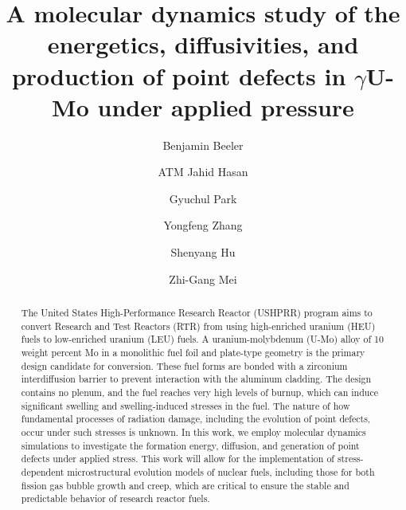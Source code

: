 \documentclass[review]{elsarticle}
\begin{document}
\begin{frontmatter} 

\title{A molecular dynamics study of the energetics, diffusivities, and production of point defects in $\gamma$U-Mo under applied pressure}

\author[ncsu,inl]{Benjamin Beeler }
\author[ncsu]{ATM Jahid Hasan}
\author[anl]{Gyuchul Park}
\author[wis,inl]{Yongfeng Zhang}
\author[pnnl]{Shenyang Hu}
\author[anl]{Zhi-Gang Mei}

\address[ncsu]{Department of Nuclear Engineering, North Carolina State University, Raleigh, NC 27695, United States}
\address[inl]{Idaho National Laboratory, Idaho Falls, ID 83415, United States}
\address[anl]{Argonne National Laboratory, Lemont, IL 60439, United States}
\address[wis]{Department of Nuclear Engineering and Engineering Physics, University of Wisconsin-Madison, Madison, WI 53706, United States}
\address[pnnl]{Pacific Northwest National Laboratory, Richland, WA 99354, United States}



\begin{abstract}
The United States High-Performance Research Reactor (USHPRR) program aims to convert Research and Test Reactors (RTR) from using high-enriched uranium (HEU) fuels to low-enriched uranium (LEU) fuels. A uranium-molybdenum (U-Mo) alloy of 10 weight percent Mo in a monolithic fuel foil and plate-type geometry is the primary design candidate for conversion. These fuel forms are bonded with a zirconium interdiffusion barrier to prevent interaction with the aluminum cladding. The design contains no plenum, and the fuel reaches very high levels of burnup, which can induce significant swelling and swelling-induced stresses in the fuel. The nature of how fundamental processes of radiation damage, including the evolution of point defects, occur under such stresses is unknown. In this work, we employ molecular dynamics simulations to investigate the formation energy, diffusion, and generation of point defects under applied stress. This work will allow for the implementation of stress-dependent microstructural evolution models of nuclear fuels, including those for both fission gas bubble growth and creep, which are critical to ensure the stable and predictable behavior of research reactor fuels.

\end{abstract}

\end{frontmatter}
\linenumbers
\end{document}
